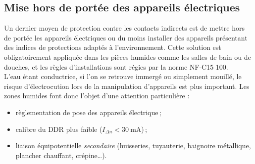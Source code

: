 

\subsection{Mise hors de portée des appareils électriques}

Un dernier moyen de protection contre les contacts indirects est de mettre hors de portée les appareils électriques ou du moins installer des appareils présentant des indices de protections adaptés à l'environnement. Cette solution est obligatoirement appliquée dans les pièces humides comme les salles de bain ou de douches, et les règles d'installations sont régies par la norme NF-C15 100\supercite{NF:C15-100-2015}.\\
L'eau étant conductrice, si l'on se retrouve immergé ou simplement mouillé, le risque d'électrocution lors de la manipulation d'appareils est plus important. Les zones humides font donc l'objet d'une attention particulière :
\begin{itemize}
\item règlementation de pose des appareils électrique\,;
\item calibre du DDR plus faible ($I_{\Delta n}<\SI{30}{\milli\ampere}$)\,;
\item liaison équipotentielle \emph{secondaire} (huisseries, tuyauterie, baignoire métallique, plancher chauffant, crépine\ldots).
\end{itemize}




